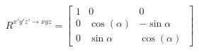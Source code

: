 \[
R^{x'y'z' \rightarrow xyz}=
  \begin{bmatrix}
    1 & 0 & 0\\
    0 & \cos(\alpha) & -\sin{\alpha}\\ 
    0 & \sin{\alpha} & \cos(\alpha)\
    \end{bmatrix}
\]